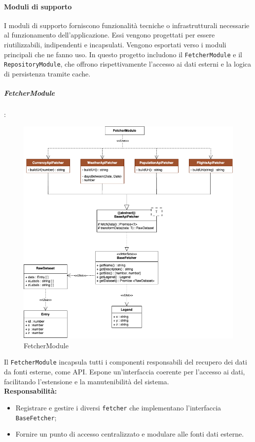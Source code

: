 \paragraph{Moduli di supporto}
I moduli di supporto forniscono funzionalità tecniche o infrastrutturali necessarie al funzionamento dell’applicazione.
Essi vengono progettati per essere riutilizzabili, indipendenti e incapsulati. Vengono esportati verso i moduli principali che ne fanno uso.
In questo progetto includono il \texttt{FetcherModule} e il \texttt{RepositoryModule}, che offrono rispettivamente l'accesso ai dati esterni e la logica di persistenza tramite cache.


\subparagraph{FetcherModule}:

\begin{figure}[H] 
    \centering
    \includegraphics[scale = 0.5]{template/images/uml_back/FetcherModule.png}
    \caption{FetcherModule}
\end{figure}

Il \texttt{FetcherModule} incapsula tutti i componenti responsabili del recupero dei dati da fonti esterne, come API. Espone un'interfaccia coerente per l’accesso ai dati, facilitando l’estensione e la manutenibilità del sistema.\\

\textbf{Responsabilità:}
\begin{itemize}
    \item Registrare e gestire i diversi \texttt{fetcher} che implementano l’interfaccia \texttt{BaseFetcher};
    \item Fornire un punto di accesso centralizzato e modulare alle fonti dati esterne.
\end{itemize}

